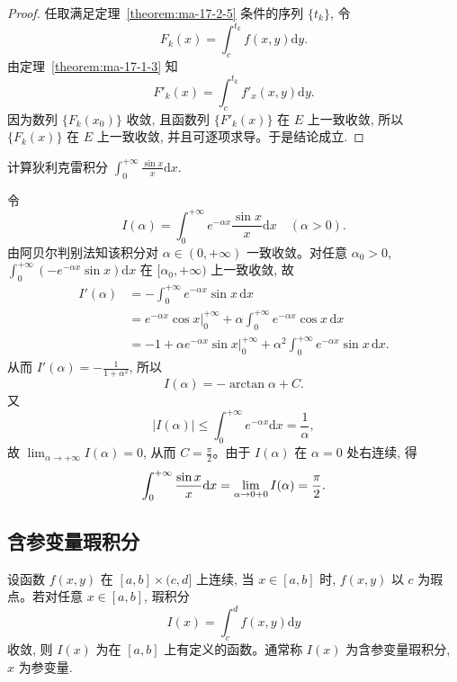 \begin{proof}
任取满足定理~\ref{theorem:ma-17-2-5} 条件的序列 $\{t_k\}$, 令
\[
  F_k(x)=\int_c^{t_k}f(x,y)\mathrm dy.
\]
由定理~\ref{theorem:ma-17-1-3} 知
\[
  F'_k(x)=\int_c^{t_k}f'_x(x,y)\mathrm dy.
\]
因为数列 $\{F_k(x_0)\}$ 收敛, 且函数列 $\{F'_k(x)\}$ 在 $E$ 上一致收敛, 所以 $\{F_k(x)\}$ 在 $E$ 上一致收敛, 并且可逐项求导。于是结论成立.
\end{proof}


\begin{example}\label{example:ma-17-2-5}
计算狄利克雷积分 $\int_0^{+\infty}\frac{\sin x}{x}\mathrm dx$.
\end{example}


\begin{solve}
令
\[
  I(\alpha)=\int_0^{+\infty}e^{-\alpha x}\frac{\sin x}{x}\mathrm dx\quad(\alpha>0).
\]
由阿贝尔判别法知该积分对 $\alpha\in(0,+\infty)$ 一致收敛。对任意 $\alpha_0>0$, $\int_0^{+\infty}(-e^{-\alpha x}\sin x)\mathrm dx$ 在 $[\alpha_0,+\infty)$ 上一致收敛, 故
\[
\begin{aligned}
  I'(\alpha)
  &=-\int_0^{+\infty}e^{-\alpha x}\sin x\,\mathrm dx\\
  &=e^{-\alpha x}\cos x\Big|_0^{+\infty}
    +\alpha\int_0^{+\infty}e^{-\alpha x}\cos x\,\mathrm dx\\
  &=-1+\alpha e^{-\alpha x}\sin x\Big|_0^{+\infty}
    +\alpha^2\int_0^{+\infty}e^{-\alpha x}\sin x\,\mathrm dx.
\end{aligned}
\]
从而 $I'(\alpha)=-\frac1{1+\alpha^2}$, 所以
\[
  I(\alpha)=-\arctan\alpha+C.
\]
又
\[
  |I(\alpha)|\leqslant\int_0^{+\infty}e^{-\alpha x}\mathrm dx=\frac1\alpha,
\]
故 $\lim_{\alpha\to+\infty}I(\alpha)=0$, 从而 $C=\frac\pi2$。由于 $I(\alpha)$ 在 $\alpha=0$ 处右连续, 得
\[
  \int_0^{+\infty}\frac{\sin x}{x}\mathrm dx
  =\lim_{\alpha\to0+0}I(\alpha)=\frac\pi2.
\qedhere
\]
\end{solve}


\subsection{含参变量瑕积分}
\label{subsec:ma-17-2-3}

设函数 $f(x,y)$ 在 $[a,b]\times(c,d]$ 上连续, 当 $x\in[a,b]$ 时, $f(x,y)$ 以 $c$ 为瑕点。若对任意 $x\in[a,b]$, 瑕积分
\begin{equation}
  I(x)=\int_c^d f(x,y)\mathrm dy
  \label{eq:ma-17-2-4}
\end{equation}
收敛, 则 $I(x)$ 为在 $[a,b]$ 上有定义的函数。通常称 $I(x)$ 为含参变量瑕积分, $x$ 为参变量.

